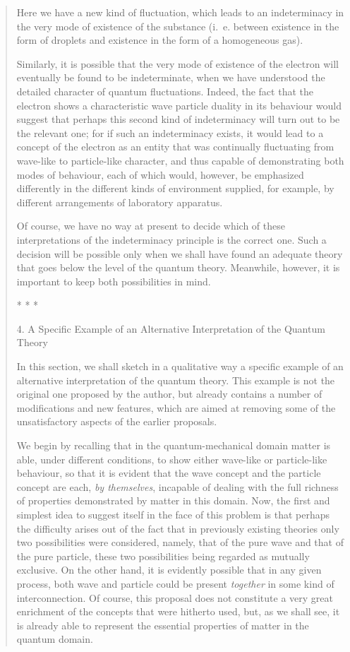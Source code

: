 \documentclass[11pt]{memoir}
\begin{document}
\begin{quote}
Here we have a new kind of fluctuation, which leads to an indeterminacy
in the very mode of existence of the substance (i.~e. between existence
in the form of droplets and existence in the form of a homogeneous gas).

Similarly, it is possible that the very mode of existence of the
electron will eventually be found to be indeterminate, when we have
understood the detailed character of quantum fluctuations. Indeed, the
fact that the electron shows a characteristic wave particle duality in
its behaviour would suggest that perhaps this second kind of
indeterminacy will turn out to be the relevant one; for if such an
indeterminacy exists, it would lead to a concept of the electron as an
entity that was continually fluctuating from wave-like to particle-like
character, and thus capable of demonstrating both modes of behaviour,
each of which would, however, be emphasized differently in the different
kinds of environment supplied, for example, by different arrangements of
laboratory apparatus.

Of course, we have no way at present to decide which of these
interpretations of the indeterminacy principle is the correct one. Such
a decision will be possible only when we shall have found an adequate
theory that goes below the level of the quantum theory. Meanwhile,
however, it is important to keep both possibilities in mind.\\
\centerline{* * *}
%
4. A Specific Example of an Alternative Interpretation of the Quantum
Theory

In this section, we shall sketch in a qualitative way a specific example
of an alternative interpretation of the quantum theory. This example is
not the original one proposed by the author, but already contains a
number of modifications and new features, which are aimed at removing
some of the unsatisfactory aspects of the earlier proposals.

We begin by recalling that in the quantum-mechanical domain matter is
able, under different conditions, to show either wave-like or
particle-like behaviour, so that it is evident that the wave concept and
the particle concept are each, \emph{by themselves}, incapable of
dealing with the full richness of properties demonstrated by matter in
this domain. Now, the first and simplest idea to suggest itself in the
face of this problem is that perhaps the difficulty arises out of the
fact that in previously existing theories only two possibilities were
considered, namely, that of the pure wave and that of the pure particle,
these two possibilities being regarded as mutually exclusive. On the
other hand, it is evidently possible that in any given process, both
wave and particle could be present \emph{together} in some kind of
interconnection. Of course, this proposal does not constitute a very
great enrichment of the concepts that were hitherto used, but, as we
shall see, it is already able to represent the essential properties of
matter in the quantum domain.


\end{quote}
\end{document}
